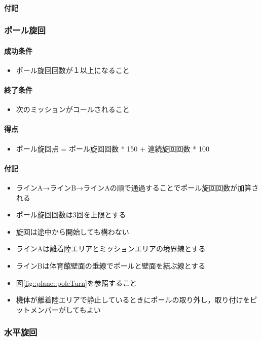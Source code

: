 \paragraph{付記}

\subsubsection{ポール旋回}
\paragraph{成功条件}
\begin{itemize}
\item ポール旋回回数が１以上になること
\end{itemize}
\paragraph{終了条件}
\begin{itemize}
\item 次のミッションがコールされること
\end{itemize}
\paragraph{得点}
\begin{itemize}
\item ポール旋回点 = ポール旋回回数 * 150 + 連続旋回回数 * 100
\end{itemize}
\paragraph{付記}
\begin{itemize}
\item ラインA→ラインB→ラインAの順で通過することでポール旋回回数が加算される
\item ポール旋回回数は3回を上限とする
\item 旋回は途中から開始しても構わない
\item ラインAは離着陸エリアとミッションエリアの境界線とする
\item ラインBは体育館壁面の垂線でポールと壁面を結ぶ線とする
  \item 図\ref{fig::plane::poleTurn}を参照すること
\item 機体が離着陸エリアで静止しているときにポールの取り外し，取り付けをピットメンバーがしてもよい
\end{itemize}

\subsubsection{水平旋回}
